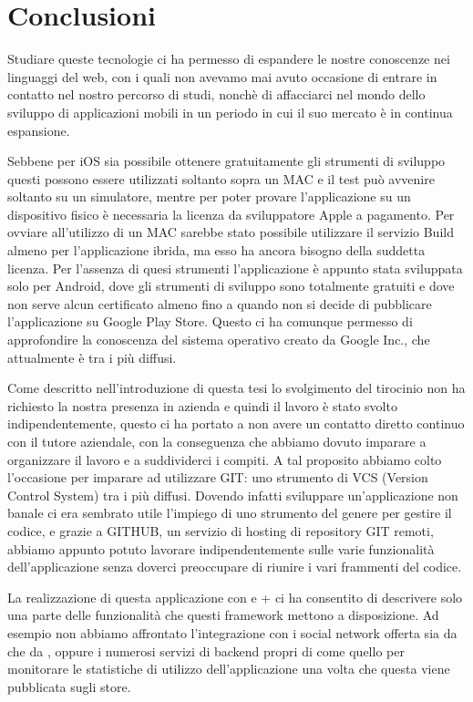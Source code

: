\chapter{Conclusioni}
    Studiare queste tecnologie ci ha permesso di espandere le nostre
    conoscenze nei linguaggi del web, con i quali non avevamo mai avuto
    occasione di entrare in contatto nel nostro percorso di studi, nonchè di
    affacciarci nel mondo dello sviluppo di applicazioni mobili in un periodo in
    cui il suo mercato è in continua espansione.

    Sebbene per iOS
    sia possibile ottenere gratuitamente gli strumenti di sviluppo questi
    possono essere utilizzati soltanto sopra un MAC e il test può avvenire
    soltanto su un simulatore, mentre per poter provare l'applicazione su un
    dispositivo fisico è necessaria la licenza da sviluppatore Apple a
    pagamento. Per ovviare all'utilizzo di un MAC sarebbe stato
    possibile utilizzare il servizio \pg{} Build almeno per l'applicazione
    ibrida, ma
    esso ha ancora bisogno della suddetta licenza. Per l'assenza di quesi
    strumenti l'applicazione è appunto stata sviluppata solo per Android, dove
    gli strumenti di sviluppo sono totalmente gratuiti e dove non serve alcun
    certificato almeno fino a quando non si decide di pubblicare
    l'applicazione su Google Play Store.
    Questo ci ha comunque permesso di approfondire la
    conoscenza del sistema operativo creato da Google Inc., che attualmente è
    tra i più diffusi.

    Come descritto nell'introduzione di questa tesi lo svolgimento del
    tirocinio non ha richiesto la nostra presenza in azienda e quindi il
    lavoro è stato svolto indipendentemente, questo ci ha portato a non avere
    un contatto diretto continuo con il tutore aziendale, con la conseguenza
    che abbiamo dovuto imparare a organizzare il lavoro e a suddividerci i
    compiti. A tal proposito abbiamo colto l'occasione per imparare ad
    utilizzare GIT: uno strumento di VCS (Version Control System) tra i più
    diffusi. Dovendo infatti sviluppare un'applicazione non banale ci era
    sembrato utile l'impiego di uno strumento del genere per gestire il codice,
    e grazie a GITHUB, un servizio di hosting  di repository GIT remoti, abbiamo
    appunto potuto lavorare indipendentemente sulle varie funzionalità
    dell'applicazione senza doverci preoccupare di riunire i vari frammenti
    del codice.

    La realizzazione di questa applicazione con \tisdk{} e \pg{}+\kendomob{}
    ci ha consentito di descrivere solo una parte delle funzionalità che
    questi framework mettono a disposizione. Ad esempio non abbiamo affrontato
    l'integrazione con i social network offerta sia da \tisdk{} che da \pg{},
    oppure i numerosi servizi di backend propri di \tisdk{} come quello per
    monitorare le statistiche di utilizzo dell'applicazione una volta che
    questa viene pubblicata sugli store.

